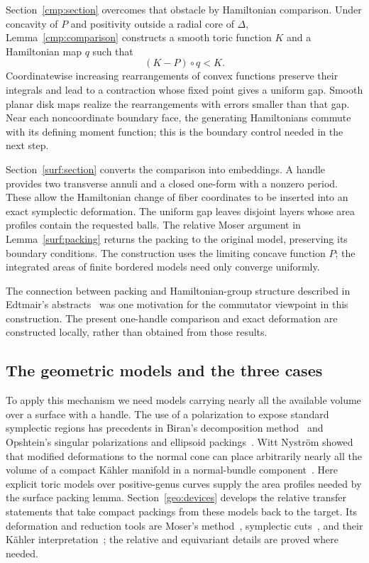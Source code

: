 Section~\ref{cmp:section} overcomes that obstacle by Hamiltonian
comparison. Under concavity of \(P\) and positivity outside a radial
core of \(\Delta\), Lemma~\ref{cmp:comparison} constructs a smooth
toric function \(K\) and a Hamiltonian map \(q\) such that
\[
 (K-P)\circ q<K.
\]
Coordinatewise increasing rearrangements of convex functions preserve
their integrals and lead to a contraction whose fixed point gives a
uniform gap. Smooth planar disk maps realize the rearrangements with
errors smaller than that gap. Near each noncoordinate boundary face,
the generating Hamiltonians commute with its defining moment function;
this is the boundary control needed in the next step.

Section~\ref{surf:section} converts the comparison into embeddings.
A handle provides two transverse annuli and a closed one-form with a
nonzero period. These allow the Hamiltonian change of fiber coordinates
to be inserted into an exact symplectic deformation. The uniform gap
leaves disjoint layers whose area profiles contain the requested balls.
The relative Moser argument in Lemma~\ref{surf:packing} returns the
packing to the original model, preserving its boundary conditions.
The construction uses the limiting concave function \(P\); the
integrated areas of finite bordered models need only converge uniformly.

The connection between packing and Hamiltonian-group structure described
in Edtmair's abstracts~\cite{EdtmairPerfectness2025,EdtmairPacking2025}
was one motivation for the commutator viewpoint in this construction.
The present one-handle comparison and exact deformation are constructed
locally, rather than obtained from those results.

\subsection{The geometric models and the three cases}

To apply this mechanism we need models carrying nearly all the available
volume over a surface with a handle. The use of a polarization to expose
standard symplectic regions has precedents in Biran's decomposition
method~\cite{Biran2001} and Opshtein's singular polarizations and
ellipsoid packings~\cite{Opshtein2013}. Witt Nystr\"om showed that modified
deformations to the normal cone can place arbitrarily nearly all the
volume of a compact K\"ahler manifold in a normal-bundle
component~\cite{WittNystrom2024}. Here explicit toric models over
positive-genus curves supply the area profiles needed by the surface
packing lemma. Section~\ref{geo:devices} develops the relative transfer
statements that take compact packings from these models back to the
target. Its deformation and reduction tools are Moser's
method~\cite{Moser1965}, symplectic cuts~\cite{Lerman1995}, and their
K\"ahler interpretation~\cite{BurnsGuilleminLerman2002}; the relative and
equivariant details are proved where needed.

